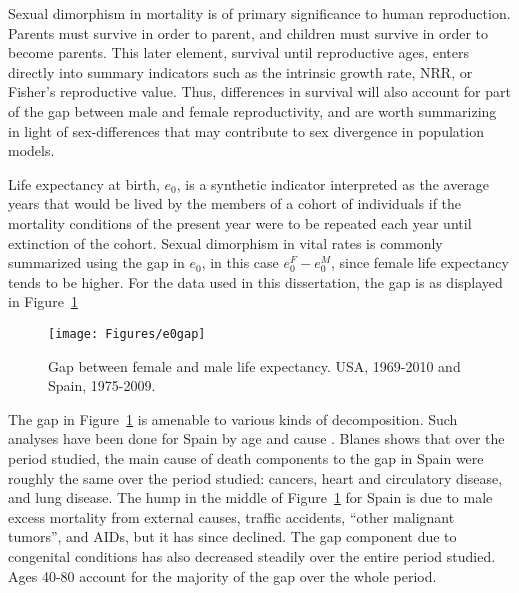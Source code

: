  \FloatBarrier
Sexual dimorphism in mortality is of primary significance to human reproduction.
Parents must survive in order to parent, and children must survive in order to
become parents. This later element, survival until reproductive ages, enters
directly into summary indicators such as the intrinsic growth rate, NRR, or
Fisher's reproductive value. Thus, differences in survival will also account for
part of the gap between male and female reproductivity, and are worth summarizing 
in light of sex-differences
that may contribute to sex divergence in population models.

Life expectancy at birth, $e_0$, is a synthetic indicator interpreted as the
average years that would be lived by the members of a cohort of individuals if
the mortality conditions of the present year were to be repeated each year until extinction of
the cohort. Sexual dimorphism in vital rates is commonly summarized using the
gap in $e_0$, in this case $e_0^F - e_0^M$, since female life expectancy tends
to be higher. For the data used in this dissertation, the gap is as displayed in
Figure~\ref{fig:e0gap}

\begin{figure}[!ht]
  \centering
    \caption{Gap between female and male life expectancy. USA,
    1969-2010 and Spain, 1975-2009.}
     \texttt{[image: Figures/e0gap]}
     \label{fig:e0gap}
\end{figure}

The gap in Figure~\ref{fig:e0gap} is amenable to various kinds of decomposition.
Such analyses have been done for Spain by age and cause \citep[pp 217-218 and
447]{amand2007thesis}. Blanes shows that over the period studied, the main cause of death components to the
gap in Spain were roughly the same over the period studied: cancers, heart
and circulatory disease, and lung disease. The hump in the middle of
Figure~\ref{fig:e0gap} for Spain is due to male excess mortality from external
causes, traffic accidents, ``other malignant tumors'', and AIDs, but it has
since declined. The gap component due to congenital conditions has also
decreased steadily over the entire period studied. Ages 40-80 account for the
majority of the gap over the whole period.

